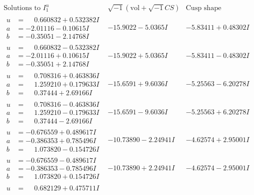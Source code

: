 \documentclass[1p]{elsarticle_modified}
\theoremstyle{definition}
\newcommand{\I}{\sqrt{-1}}
\begin{document}
$$\begin{array}{c|c|c}  
\text{Solutions to }I^u_{1}& \I (\text{vol} + \sqrt{-1}CS) & \text{Cusp shape}\\
 \hline 
\begin{aligned}
u &= \phantom{-}0.660832 + 0.532382 I \\
a &= -2.01116 - 0.10615 I \\
b &= -0.35051 - 2.14768 I\end{aligned}
 & -15.9022 - 5.0365 I & -5.83411 + 0.48302 I \\ \hline\begin{aligned}
u &= \phantom{-}0.660832 - 0.532382 I \\
a &= -2.01116 + 0.10615 I \\
b &= -0.35051 + 2.14768 I\end{aligned}
 & -15.9022 + 5.0365 I & -5.83411 - 0.48302 I \\ \hline\begin{aligned}
u &= \phantom{-}0.708316 + 0.463836 I \\
a &= \phantom{-}1.259210 + 0.179633 I \\
b &= \phantom{-}0.37444 + 2.69166 I\end{aligned}
 & -15.6591 + 9.6036 I & -5.25563 - 6.20278 I \\ \hline\begin{aligned}
u &= \phantom{-}0.708316 - 0.463836 I \\
a &= \phantom{-}1.259210 - 0.179633 I \\
b &= \phantom{-}0.37444 - 2.69166 I\end{aligned}
 & -15.6591 - 9.6036 I & -5.25563 + 6.20278 I \\ \hline\begin{aligned}
u &= -0.676559 + 0.489617 I \\
a &= -0.386353 + 0.785496 I \\
b &= \phantom{-}1.073820 - 0.154726 I\end{aligned}
 & -10.73890 - 2.24941 I & -4.62574 + 2.95001 I \\ \hline\begin{aligned}
u &= -0.676559 - 0.489617 I \\
a &= -0.386353 - 0.785496 I \\
b &= \phantom{-}1.073820 + 0.154726 I\end{aligned}
 & -10.73890 + 2.24941 I & -4.62574 - 2.95001 I \\ \hline\begin{aligned}
u &= \phantom{-}0.682129 + 0.475711 I \\

\end{aligned}
\end{array}$$
\end{document}
